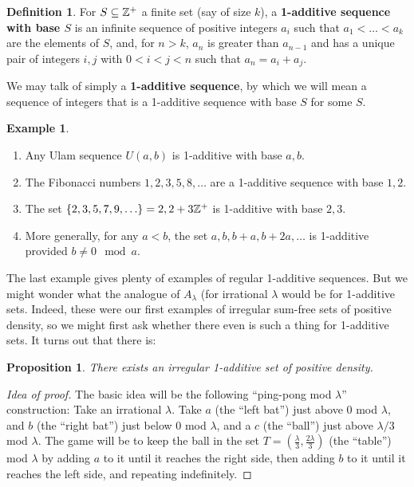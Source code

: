\documentclass{article}
\newtheorem{proposition}[theorem]{Proposition}
\theoremstyle{definition}
\newtheorem{definition}{Definition}
\newtheorem{example}{Example}
\theoremstyle{remark}
\numberwithin{equation}{section}
\begin{document}
{\begin{definition}\label{def:1additive}
  For $S \subseteq \mathbb{Z}^+$ a finite set (say of size $k$), a
  \textbf{1-additive sequence with base $S$} is an infinite sequence
  of positive integers $a_i$ such that $a_1 < \ldots < a_k$ are the
  elements of $S$, and, for $n > k$, $a_n$ is greater than $a_{n-1}$
  and has a unique pair of integers $i, j$ with $0 < i < j < n$ such
  that $a_n = a_i + a_j$.

  We may talk of simply a \textbf{1-additive sequence}, by which we
  will mean a sequence of integers that is a 1-additive sequence with
  base $S$ for some $S$.
\end{definition}

\begin{example}
  \begin{enumerate}
  \item Any Ulam sequence $U(a,b)$ is 1-additive with base $a, b$.  
  \item The Fibonacci numbers $1, 2, 3, 5, 8, \ldots$ are a 1-additive
    sequence with base $1, 2$.  
  \item The set $\{2, 3, 5, 7, 9, \ldots\} = 2, 2+3\mathbb{Z}^+$ is 1-additive
    with base $2, 3$.  
  \item More generally, for any $a < b$, the set $a, b, b+a, b+2a,
    \ldots$ is 1-additive provided $b \neq 0 \mod{a}$.  
  \end{enumerate}
\end{example}

The last example gives plenty of examples of regular 1-additive
sequences.  But we might wonder what the analogue of $A_\lambda$ (for
irrational $\lambda$ would be for 1-additive sets.  Indeed, these were
our first examples of irregular sum-free sets of positive density, so
we might first ask whether there even is such a thing for 1-additive
sets.  It turns out that there is: 

\begin{proposition}
  There exists an irregular 1-additive set of positive density.
\end{proposition}

\begin{proof}[Idea of proof]
  The basic idea will be the following ``ping-pong mod $\lambda$''
  construction: Take an irrational $\lambda$.  Take $a$ (the ``left
  bat'') just above $0$ mod $\lambda$, and $b$ (the ``right bat'')
  just below 0 mod $\lambda$, and a $c$ (the ``ball'') just above
  $\lambda/3$ mod $\lambda$.  The game will be to keep the ball in the
  set $T = (\frac{\lambda}{3}, \frac{2\lambda}{3})$ (the ``table'')
  mod $\lambda$ by adding $a$ to it until it reaches the right side,
  then adding $b$ to it until it reaches the left side, and repeating
  indefinitely.


\end{proof}}
\end{document}
